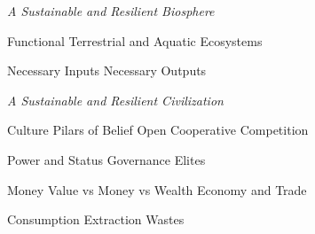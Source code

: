 \documentclass[12pt, letterpaper]{article}
\begin{document}
\large
\begin{flushleft}
\textit{A Sustainable and Resilient Biosphere}
\end{flushleft}

\normalsize

\begin{outline}[enumerate]
\1 Functional Terrestrial and Aquatic Ecosystems

\2 Necessary Inputs
\2 Necessary Outputs

\end{outline}

\large
\begin{flushleft}
\textit{A Sustainable and Resilient Civilization}
\end{flushleft}

\normalsize

\begin{outline}[enumerate]
\1 Culture
\2 Pilars of Belief
\2 Open Cooperative Competition

\1 Power and Status
\2 Governance
\2 Elites

\1 Money
\2 Value vs Money vs Wealth
\2 Economy and Trade

\1 Consumption
\2 Extraction
\2 Wastes

\end{outline}




\clearpage 
\renewcommand{\thepage}{}
\printbibliography
\end{document}
